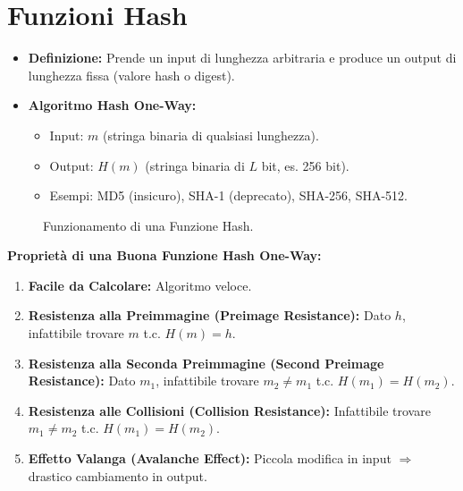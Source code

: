 \section{Funzioni Hash}
\begin{itemize}
    \item \textbf{Definizione:} Prende un input di lunghezza arbitraria e produce un output di lunghezza fissa (valore hash o digest).
    \item \textbf{Algoritmo Hash One-Way:}
    \begin{itemize}
        \item Input: $m$ (stringa binaria di qualsiasi lunghezza).
        \item Output: $H(m)$ (stringa binaria di $L$ bit, es. 256 bit).
        \item Esempi: MD5 (insicuro), SHA-1 (deprecato), SHA-256, SHA-512.
    \end{itemize}
\end{itemize}
\begin{figure}[H]
    \centering
    \caption{Funzionamento di una Funzione Hash.}
    \label{fig:hash_function}
\end{figure}
\textbf{Proprietà di una Buona Funzione Hash One-Way:}
\begin{enumerate}
    \item \textbf{Facile da Calcolare:} Algoritmo veloce.
    \item \textbf{Resistenza alla Preimmagine (Preimage Resistance):} Dato $h$, infattibile trovare $m$ t.c. $H(m)=h$.
    \item \textbf{Resistenza alla Seconda Preimmagine (Second Preimage Resistance):} Dato $m_1$, infattibile trovare $m_2 \neq m_1$ t.c. $H(m_1)=H(m_2)$.
    \item \textbf{Resistenza alle Collisioni (Collision Resistance):} Infattibile trovare $m_1 \neq m_2$ t.c. $H(m_1)=H(m_2)$.
    \item \textbf{Effetto Valanga (Avalanche Effect):} Piccola modifica in input $\Rightarrow$ drastico cambiamento in output.
\end{enumerate}

